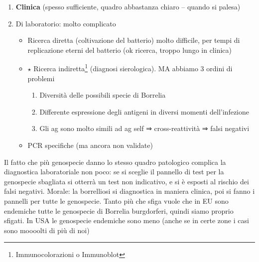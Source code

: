\documentclass[italian,]{article}
\providecommand{\tightlist}{%
  \setlength{\itemsep}{0pt}\setlength{\parskip}{0pt}}
\newcommand{\goldstandard}{\textcircled{$\star$} }                      %
\begin{document}
\begin{enumerate}
\def\labelenumi{\arabic{enumi}.}
\tightlist
\item
  \textbf{Clinica} (spesso sufficiente, quadro abbastanza chiaro --
  quando si palesa)
\item
  Di laboratorio: molto complicato

  \begin{itemize}
  \tightlist
  \item
    Ricerca diretta (coltivazione del batterio) molto difficile, per
    tempi di replicazione eterni del batterio (ok ricerca, troppo lungo
    in clinica)
  \item
    \goldstandard Ricerca indiretta\footnote{Immunocolorazioni o
      Immunoblot} (diagnosi sierologica). MA abbiamo 3 ordini di
    problemi

    \begin{enumerate}
    \def\labelenumii{\arabic{enumii}.}
    \tightlist
    \item
      Diversità delle possibili specie di Borrelia
    \item
      Differente espressione degli antigeni in diversi momenti
      dell'infezione
    \item
      Gli ag sono molto simili ad ag self ⇒ cross-reattività ⇒ falsi
      negativi
    \end{enumerate}
  \item
    PCR specifiche (ma ancora non validate)
  \end{itemize}
\end{enumerate}

\footnotesize

Il fatto che più genospecie danno lo stesso quadro patologico complica
la diagnostica laboratoriale non poco: se si sceglie il pannello di test
per la genospecie sbagliata si otterrà un test non indicativo, e si è
esposti al rischio dei falsi negativi. Morale: la borrelliosi si
diagnostica in maniera clinica, poi si fanno i pannelli per tutte le
genospecie. Tanto più che sfiga vuole che in EU sono endemiche tutte le
genospecie di Borrelia burgdorferi, quindi siamo proprio sfigati. In USA
le genospecie endemiche sono meno (anche se in certe zone i casi sono
moooolti di più di noi) \normalsize
\end{document}
